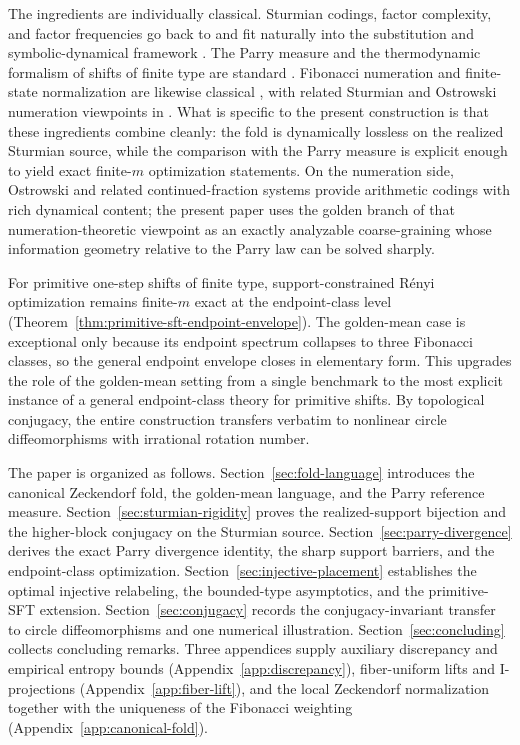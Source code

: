 The ingredients are individually classical. Sturmian codings, factor
complexity, and factor frequencies go back to
\cite{MorseHedlund1940,Slater1950DistributionIntegers,Slater1967GapsSteps}
and fit naturally into the substitution and symbolic-dynamical framework
\cite{LindMarcus1995,QueffelecSubstitution,Fogg2002}. The Parry measure and
the thermodynamic formalism of shifts of finite type are standard
\cite{LindMarcus1995,WaltersErgodicTheory,ParryPollicott1990Zeta}. Fibonacci
numeration and finite-state normalization are likewise classical
\cite{Zeckendorf1972,Frougny1991FibonacciFiniteAutomata,Frougny1992NumbersAutomata},
with related Sturmian and Ostrowski numeration viewpoints in
\cite{Berthe2001Ostrowski,BaranwalaSchaefferShallit2021OstrowskiAutomatic}.
What is specific to the present construction is that these ingredients
combine cleanly: the fold is dynamically lossless on the realized Sturmian
source, while the comparison with the Parry measure is explicit enough to
yield exact finite-$m$ optimization statements. On the numeration side,
Ostrowski and related continued-fraction systems
\cite{Berthe2001Ostrowski,BaranwalaSchaefferShallit2021OstrowskiAutomatic}
provide arithmetic codings with rich dynamical content; the present paper
uses the golden branch of that numeration-theoretic viewpoint as an exactly
analyzable coarse-graining whose information geometry relative to the Parry
law can be solved sharply.

For primitive one-step shifts of finite type, support-constrained R\'enyi
optimization remains finite-$m$ exact at the endpoint-class level
(Theorem~\ref{thm:primitive-sft-endpoint-envelope}). The golden-mean case
is exceptional only because its endpoint spectrum collapses to three
Fibonacci classes, so the general endpoint envelope closes in elementary
form. This upgrades the role of the golden-mean setting from a single
benchmark to the most explicit instance of a general endpoint-class theory
for primitive shifts. By topological conjugacy, the entire construction
transfers verbatim to nonlinear circle diffeomorphisms with irrational
rotation number.

The paper is organized as follows. Section~\ref{sec:fold-language} introduces
the canonical Zeckendorf fold, the golden-mean language, and the Parry
reference measure. Section~\ref{sec:sturmian-rigidity} proves the
realized-support bijection and the higher-block conjugacy on the Sturmian
source. Section~\ref{sec:parry-divergence} derives the exact Parry divergence
identity, the sharp support barriers, and the endpoint-class optimization.
Section~\ref{sec:injective-placement} establishes the optimal injective
relabeling, the bounded-type asymptotics, and the primitive-SFT extension.
Section~\ref{sec:conjugacy} records the conjugacy-invariant transfer to circle
diffeomorphisms and one numerical illustration. Section~\ref{sec:concluding}
collects concluding remarks. Three appendices supply auxiliary discrepancy and
empirical entropy bounds (Appendix~\ref{app:discrepancy}), fiber-uniform lifts
and I-projections (Appendix~\ref{app:fiber-lift}), and the local Zeckendorf
normalization together with the uniqueness of the Fibonacci weighting
(Appendix~\ref{app:canonical-fold}).
